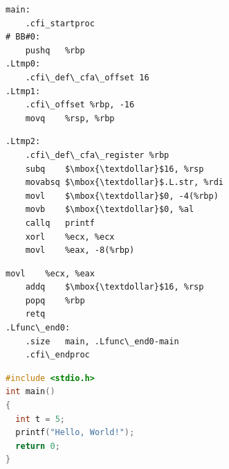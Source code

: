 \documentclass[14pt]{beamer}
\begin{document}
\newsavebox{\assem}
\begin{lrbox}{\assem}
\begin{minipage}{.3\textwidth}
\begin{lstlisting}[basicstyle=\tiny\ttfamily]
main:
	.cfi_startproc
# BB#0:
	pushq	%rbp
.Ltmp0:
	.cfi\_def\_cfa\_offset 16
.Ltmp1:
	.cfi\_offset %rbp, -16
	movq	%rsp, %rbp
\end{lstlisting}
\end{minipage}
\begin{minipage}{.3\textwidth}
\begin{lstlisting}[basicstyle=\tiny\ttfamily]
.Ltmp2:
	.cfi\_def\_cfa\_register %rbp
	subq	$\mbox{\textdollar}$16, %rsp
	movabsq	$\mbox{\textdollar}$.L.str, %rdi
	movl	$\mbox{\textdollar}$0, -4(%rbp)
	movb	$\mbox{\textdollar}$0, %al
	callq	printf
	xorl	%ecx, %ecx
	movl	%eax, -8(%rbp)
\end{lstlisting}
\end{minipage}
\begin{minipage}{.3\textwidth}
\vspace{1em}
\begin{lstlisting}[basicstyle=\tiny\ttfamily]
	movl	%ecx, %eax
	addq	$\mbox{\textdollar}$16, %rsp
	popq	%rbp
	retq
.Lfunc\_end0:
	.size	main, .Lfunc\_end0-main
	.cfi\_endproc
\end{lstlisting}
\end{minipage}

\end{lrbox}

\newsavebox{\hello}
\begin{lrbox}{\hello}
\begin{lstlisting}[basicstyle=\tiny\ttfamily, language=C, keywordstyle=\bfseries]
#include <stdio.h>
int main()
{
  int t = 5;
  printf("Hello, World!");
  return 0;
}
\end{lstlisting}
\end{lrbox}



\end{document}
